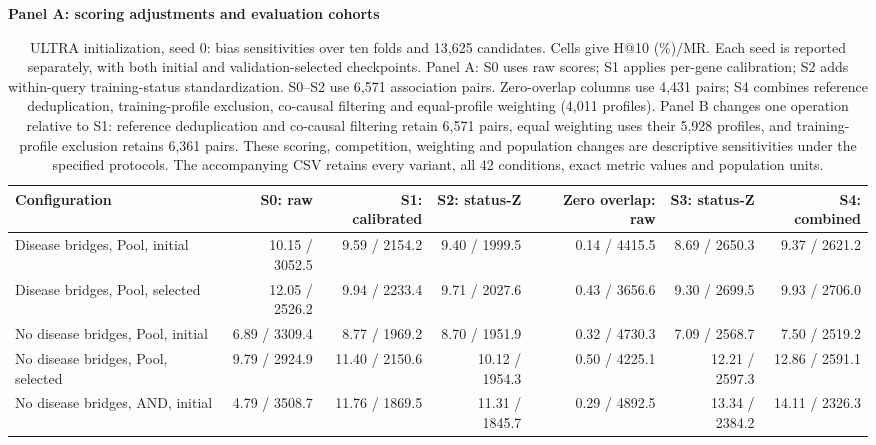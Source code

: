 \begin{landscape}
\begin{table}[p]
\centering\footnotesize
\setlength{\tabcolsep}{3pt}
\caption{ULTRA initialization, seed 0: bias sensitivities over ten folds and 13,625 candidates. Cells give H@10 (\%)/MR. Each seed is reported separately, with both initial and validation-selected checkpoints. Panel A: S0 uses raw scores; S1 applies per-gene calibration; S2 adds within-query training-status standardization. S0--S2 use 6,571 association pairs. Zero-overlap columns use 4,431 pairs; S4 combines reference deduplication, training-profile exclusion, co-causal filtering and equal-profile weighting (4,011 profiles). Panel B changes one operation relative to S1: reference deduplication and co-causal filtering retain 6,571 pairs, equal weighting uses their 5,928 profiles, and training-profile exclusion retains 6,361 pairs. These scoring, competition, weighting and population changes are descriptive sensitivities under the specified protocols. The accompanying CSV retains every variant, all 42 conditions, exact metric values and population units.}
\label{tab:controlled_bias_ultra-4g-seed0}
\textbf{Panel A: scoring adjustments and evaluation cohorts}\par\smallskip
\begin{adjustbox}{max width=\linewidth}
\begin{tabular}{lrrrrrr}
\toprule
Configuration & S0: raw & S1: calibrated & S2: status-Z & Zero overlap: raw & S3: status-Z & S4: combined \\
\midrule
Disease bridges, Pool, initial & 10.15 / 3052.5 & 9.59 / 2154.2 & 9.40 / 1999.5 & 0.14 / 4415.5 & 8.69 / 2650.3 & 9.37 / 2621.2 \\
Disease bridges, Pool, selected & 12.05 / 2526.2 & 9.94 / 2233.4 & 9.71 / 2027.6 & 0.43 / 3656.6 & 9.30 / 2699.5 & 9.93 / 2706.0 \\
No disease bridges, Pool, initial & 6.89 / 3309.4 & 8.77 / 1969.2 & 8.70 / 1951.9 & 0.32 / 4730.3 & 7.09 / 2568.7 & 7.50 / 2519.2 \\
No disease bridges, Pool, selected & 9.79 / 2924.9 & 11.40 / 2150.6 & 10.12 / 1954.3 & 0.50 / 4225.1 & 12.21 / 2597.3 & 12.86 / 2591.1 \\
No disease bridges, AND, initial & 4.79 / 3508.7 & 11.76 / 1869.5 & 11.31 / 1845.7 & 0.29 / 4892.5 & 13.34 / 2384.2 & 14.11 / 2326.3 \\

\end{tabular}
\end{adjustbox}
\end{table}
\end{landscape}
